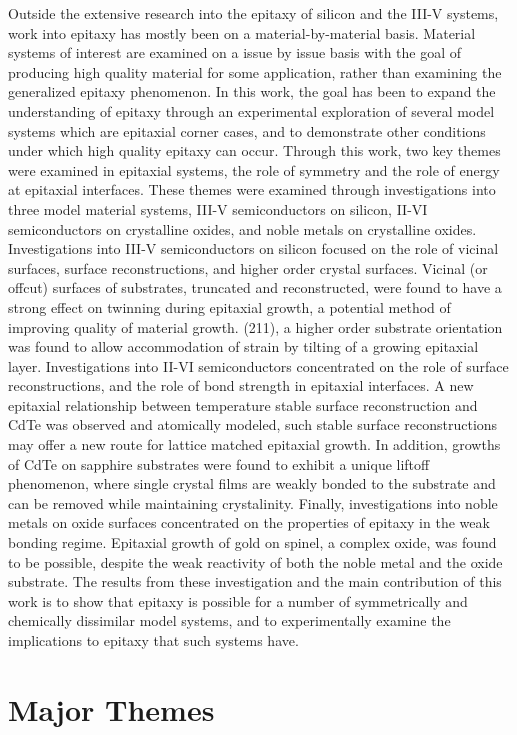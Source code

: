 Outside the extensive research into the epitaxy of silicon and the III-V systems, work into epitaxy has mostly been on a material-by-material basis.
Material systems of interest are examined on a issue by issue basis with the goal of producing high quality material for some application, rather than examining the generalized epitaxy phenomenon.
In this work, the goal has been to expand the understanding of epitaxy through an experimental exploration of several model systems which are epitaxial corner cases, and to demonstrate other conditions under which high quality epitaxy can occur.
Through this work, two key themes were examined in epitaxial systems, the role of symmetry and the role of energy at epitaxial interfaces.
These themes were examined through investigations into three model material systems, III-V semiconductors on silicon, II-VI semiconductors on crystalline oxides, and noble metals on crystalline oxides.
Investigations into III-V semiconductors on silicon focused on the role of vicinal surfaces, surface reconstructions, and higher order crystal surfaces. Vicinal (or offcut) surfaces of substrates, truncated and reconstructed, were found to have a strong effect on twinning during epitaxial growth, a potential method of improving quality of material growth. (211), a higher order substrate orientation was found to allow accommodation of strain by tilting of a growing epitaxial layer.
Investigations into II-VI semiconductors concentrated on the role of surface reconstructions, and the role of bond strength in epitaxial interfaces. A new epitaxial relationship between temperature stable surface reconstruction and CdTe was observed and atomically modeled, such stable surface reconstructions may offer a new route for lattice matched epitaxial growth. In addition, growths of CdTe on sapphire substrates were found to exhibit a unique liftoff phenomenon, where single crystal films are weakly bonded to the substrate and can be removed while maintaining crystalinity.
Finally, investigations into noble metals on oxide surfaces concentrated on the properties of epitaxy in the weak bonding regime. Epitaxial growth of gold on spinel, a complex oxide, was found to be possible, despite the weak reactivity of both the noble metal and the oxide substrate.
The results from these investigation and the main contribution of this work is to show that epitaxy is possible for a number of symmetrically and chemically dissimilar model systems, and to experimentally examine the implications to epitaxy that such systems have.

\section{Major Themes}
